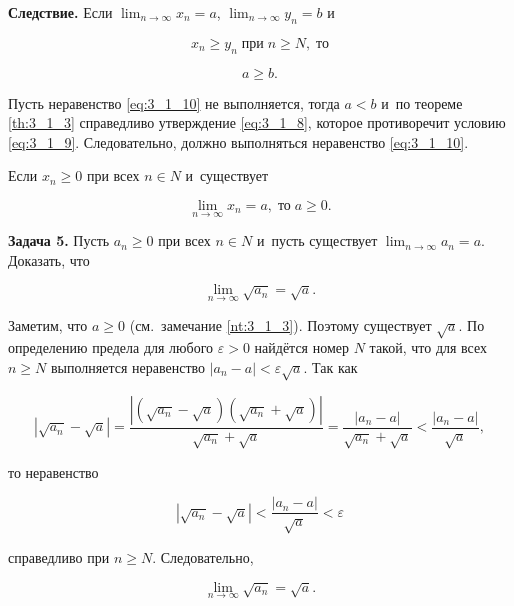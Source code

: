 \textbf{Следствие.}
Если
$\displaystyle \lim_{n \to \infty} x_{n} = a$,
$\displaystyle \lim_{n \to \infty} y_{n} = b$ и

\begin{equation}\label{eq:3_1_9}
x_{n} \geqslant y_{n} \; \text{при} \; n \geqslant N, \; \text{то}
\end{equation}

\begin{equation}\label{eq:3_1_10}
a \geqslant b.
\end{equation}

Пусть неравенство \eqref{eq:3_1_10} не выполняется, тогда $a < b$
и~по теореме \ref{th:3_1_3} справедливо утверждение \eqref{eq:3_1_8},
которое противоречит условию \eqref{eq:3_1_9}.
Следовательно, должно выполняться неравенство \eqref{eq:3_1_10}.

\begin{Note}\label{nt:3_1_4}
Если $x_{n} \geqslant 0$ при всех $n \in N$ и~существует

\begin{equation*}
\displaystyle \lim_{n \to \infty} x_{n} = a, \; \text{то} \; a \geqslant 0.
\end{equation*}
\end{Note}

\textbf{Задача 5.}\label{ex:3_1_5}
Пусть $a_{n} \geqslant 0$ при всех $n \in N$ и~пусть существует
$\displaystyle \lim_{n \to \infty} a_{n} = a$.
Доказать, что

\begin{equation*}
\displaystyle \lim_{n \to \infty} \sqrt{a_{n}} = \sqrt{a}.
\end{equation*}

Заметим, что $a \geqslant 0$ (см.\ замечание \ref{nt:3_1_3}).
Поэтому существует $\sqrt{a}$. По определению предела для любого $\varepsilon > 0$
найдётся номер $N$ такой, что для всех $n \geqslant N$ выполняется неравенство
$|a_{n} - a| < \varepsilon\sqrt{a}$. Так как

\begin{equation*}
\displaystyle
\left|
\sqrt{a_{n}} - \sqrt{a} 
\right| =
\frac{
\left| (\sqrt{a_{n}} - \sqrt{a})(\sqrt{a_{n}} + \sqrt{a}) \right|}{
\sqrt{a_{n}} + \sqrt{a}} =
\frac{|a_{n} - a|}{\sqrt{a_{n}} + \sqrt{a}} <
\frac{|a_{n} - a|}{\sqrt{a}},
\end{equation*}

\noindent
то неравенство

\begin{equation*}
\displaystyle
\left| \sqrt{a_{n}} - \sqrt{a} \right| <
\frac{|a_{n} - a|}{\sqrt{a}} <
\varepsilon
\end{equation*}

\noindent
справедливо при $n \geqslant N$. Следовательно,

\begin{equation*}
\displaystyle \lim_{n \to \infty} \sqrt{a_{n}} = \sqrt{a}.
\end{equation*}

